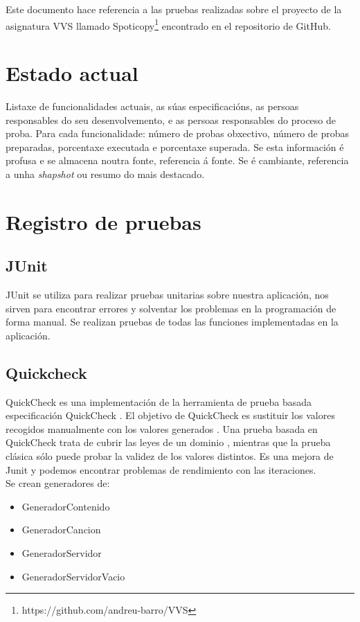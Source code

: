 \documentclass[12pt, a4paper, titlepage]{article}
\begin{document}
	Este documento hace referencia a las pruebas realizadas sobre el proyecto de la asignatura VVS llamado Spoticopy\footnote{https://github.com/andreu-barro/VVS} encontrado en el repositorio de GitHub.
	
	\section{Estado actual}
	
	Listaxe de funcionalidades actuais, as súas especificacións, as persoas responsables do seu desenvolvemento, e as persoas responsables do proceso de proba.  Para cada funcionalidade: número de probas obxectivo, número de probas preparadas, porcentaxe executada e porcentaxe superada. Se esta información é profusa e se almacena noutra fonte, referencia á fonte. Se é cambiante, referencia a unha \emph{shapshot} ou resumo do mais destacado.
	
	\section{Registro de pruebas}
	\subsection{JUnit}
	JUnit se utiliza para realizar pruebas unitarias sobre nuestra aplicación, nos sirven para encontrar errores y solventar los problemas en la programación de forma manual.
	Se realizan pruebas de todas las funciones implementadas en la aplicación.
	\subsection{Quickcheck}
	QuickCheck es una implementación de la herramienta de prueba basada especificación QuickCheck .
	El objetivo de QuickCheck es sustituir los valores recogidos manualmente con los valores generados . Una prueba basada en QuickCheck trata de cubrir las leyes de un dominio , mientras que la prueba clásica sólo puede probar la validez de los valores distintos. Es una mejora de Junit y podemos encontrar problemas de rendimiento con las iteraciones. \\
	Se crean generadores de:
	\begin{itemize}
		\item GeneradorContenido
		\item GeneradorCancion
		\item GeneradorServidor
		\item GeneradorServidorVacio
	\end{itemize}
	
\end{document}
